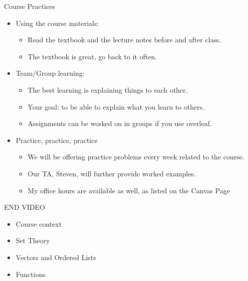 \documentclass[aspectratio=169]{beamer}
\numberwithin{equation}{section}
\begin{document}
\begin{frame}{Course Practices}

\begin{itemize}
\item Using the course materials:
\begin{itemize}
\item Read the textbook and the lecture notes before and after class.
\item The textbook is great, go back to it often.
\end{itemize}\pause
\item Team/Group learning:
\begin{itemize}
\item The best learning is explaining things to each other.
\item Your goal: to be able to explain what you learn to others.
\item Assignments can be worked on in groups if you use overleaf.
\end{itemize}
\item Practice, practice, practice
\begin{itemize}
\item We will be offering practice problems every week related to the course.
\item Our TA, Steven, will further provide worked examples.
\item My office hours are available as well, as listed on the Canvas Page
\end{itemize}
\end{itemize}

\end{frame}



\begin{frame}

END VIDEO

\end{frame}


\begin{frame}

\begin{itemize}
\item \textcolor{mygray}{Course context}
\item \textcolor{myblack}{Set Theory}
\item \textcolor{mygray}{Vectors and Ordered Lists}
\item \textcolor{mygray}{Functions}
\end{itemize}

\end{frame}
\end{document}
